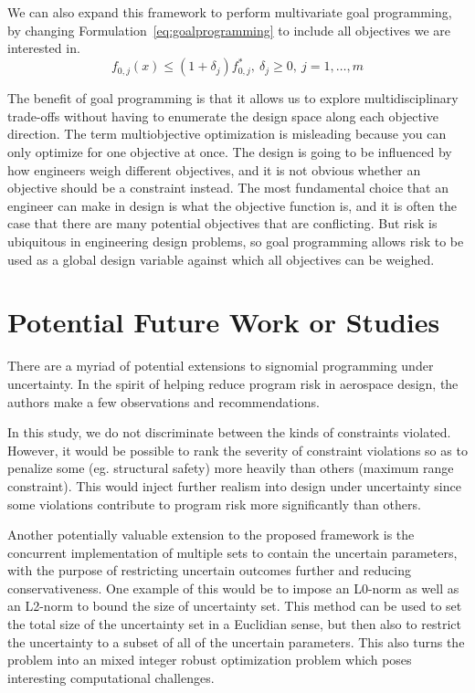 We can also expand this framework to perform multivariate goal programming,
by changing Formulation~\ref{eq:goalprogramming} to include all
objectives we are interested in.
\begin{equation}
    f_{0,j}(x) \leq (1+\delta_j) f^*_{0,j},~\delta_j \geq 0,~j = 1,\ldots, m
    \label{eq:multigoal}
\end{equation}

The benefit of goal programming is that it allows us to explore multidisciplinary trade-offs without
having to enumerate the design space along each objective direction.
The term multiobjective optimization is misleading
because you can only optimize for one objective at once.
The design is going to be influenced by how engineers weigh different objectives, and
it is not obvious whether an objective should be a constraint instead. The most
fundamental choice that an engineer can make in design is what the objective function is, and it is
often the case that there are many potential objectives that are conflicting.
But risk is ubiquitous in engineering design problems, so goal programming allows risk to be used as
a global design variable against which all objectives can be weighed.

\section{Potential Future Work or Studies}

There are a myriad of potential extensions to signomial programming under uncertainty.
In the spirit of helping reduce program risk in aerospace design,
the authors make a few observations and recommendations.

In this study, we do not discriminate between the kinds of constraints violated. However, it would
be possible to rank the severity of constraint violations so as to penalize some (eg. structural safety)
more heavily than others (maximum range constraint). This would inject further realism into
design under uncertainty since some violations contribute to program risk more
significantly than others.

Another potentially valuable extension to the proposed framework is the concurrent implementation
of multiple sets to contain the uncertain parameters, with the purpose of restricting uncertain
outcomes further and reducing conservativeness.
One example of this would be to impose {\color{blue}an L0-norm as well as an L2-norm}
to bound the size of uncertainty set.
This method can be used to set the total size of the uncertainty set in a Euclidian sense,
but then also to restrict the uncertainty to a subset of all of the uncertain parameters.
This also turns the problem into an mixed integer robust
optimization problem which poses interesting computational challenges.

